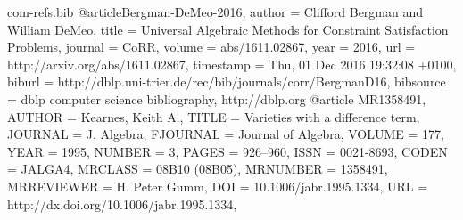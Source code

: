 \begin{filecontents*}{com-refs.bib}
@article{Bergman-DeMeo-2016,
  author    = {Clifford Bergman and William DeMeo},
  title     = {Universal Algebraic Methods for Constraint Satisfaction Problems},
  journal   = {CoRR},
  volume    = {abs/1611.02867},
  year      = {2016},
  url       = {http://arxiv.org/abs/1611.02867},
  timestamp = {Thu, 01 Dec 2016 19:32:08 +0100},
  biburl    = {http://dblp.uni-trier.de/rec/bib/journals/corr/BergmanD16},
  bibsource = {dblp computer science bibliography, http://dblp.org}
}
@article {MR1358491,
    AUTHOR = {Kearnes, Keith A.},
     TITLE = {Varieties with a difference term},
   JOURNAL = {J. Algebra},
  FJOURNAL = {Journal of Algebra},
    VOLUME = {177},
      YEAR = {1995},
    NUMBER = {3},
     PAGES = {926--960},
      ISSN = {0021-8693},
     CODEN = {JALGA4},
   MRCLASS = {08B10 (08B05)},
  MRNUMBER = {1358491},
MRREVIEWER = {H. Peter Gumm},
       DOI = {10.1006/jabr.1995.1334},
       URL = {http://dx.doi.org/10.1006/jabr.1995.1334},
}
\end{filecontents*}
\documentclass[12pt]{amsart}


\usepackage{amsmath}
\usepackage{amscd,amssymb,amsthm} %
\usepackage{latexsym,stmaryrd,mathrsfs,enumerate,scalefnt,ifthen}
\usepackage{mathtools}
\usepackage[mathcal]{euscript}
\usepackage[colorlinks=true,urlcolor=black,linkcolor=black,citecolor=black]{hyperref}
\usepackage{url}
\usepackage{scalefnt}
\usepackage{tikz}
\usepackage{color}
\usepackage[margin=1in]{geometry}
\usepackage{scrextend}

